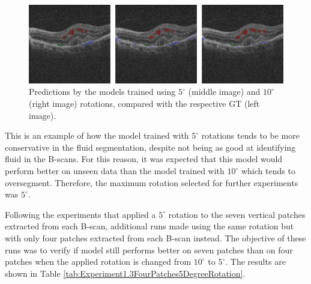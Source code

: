 \begin{figure}[!ht]
	\centering
	\includegraphics[width=1.0\linewidth]{figures/SegmentationsComparisonBetweenDifferentRotations.png}
	\caption{Predictions by the models trained using $5^{\circ}$ (middle image) and $10^{\circ}$ (right image) rotations, compared with the respective GT (left image).}
	\label{fig:SegmentationsComparisonBetweenDifferentRotations}
\end{figure}

This is an example of how the model trained with $5^{\circ}$ rotations tends to be more conservative in the fluid segmentation, despite not being as good at identifying fluid in the B-scans. For this reason, it was expected that this model would perform better on unseen data than the model trained with $10^{\circ}$ which tends to oversegment. Therefore, the maximum rotation selected for further experiments was $5^{\circ}$.
\par
Following the experiments that applied a $5^{\circ}$ rotation to the seven vertical patches extracted from each B-scan, additional runs made using the same rotation but with only four patches extracted from each B-scan instead. The objective of these runs was to verify if model still performs better on seven patches than on four patches when the applied rotation is changed from $10^{\circ}$ to $5^{\circ}$. The results are shown in Table \ref{tab:Experiment1.3FourPatches5DegreeRotation}.

